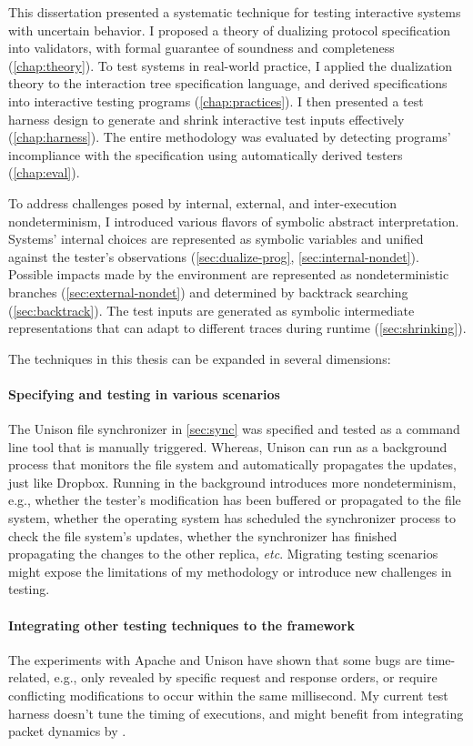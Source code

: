This dissertation presented a systematic technique for testing interactive systems
with uncertain behavior.  I proposed a theory of dualizing protocol
specification into validators, with formal guarantee of soundness and
completeness (\autoref{chap:theory}).  To test systems in real-world practice, I
applied the dualization theory to the interaction tree specification language,
and derived specifications into interactive testing programs
(\autoref{chap:practices}).  I then presented a test harness design to generate
and shrink interactive test inputs effectively (\autoref{chap:harness}).  The
entire methodology was evaluated by detecting programs' incompliance with the
specification using automatically derived testers (\autoref{chap:eval}).

To address challenges posed by internal, external, and inter-execution
nondeterminism, I introduced various flavors of symbolic abstract
interpretation.  Systems' internal choices are represented as symbolic variables
and unified against the tester's observations (\autoref{sec:dualize-prog},
\autoref{sec:internal-nondet}).  Possible impacts made by the environment are
represented as nondeterministic branches (\autoref{sec:external-nondet}) and
determined by backtrack searching (\autoref{sec:backtrack}).  The test inputs
are generated as symbolic intermediate representations that can adapt to
different traces during runtime (\autoref{sec:shrinking}).

The techniques in this thesis can be expanded in several dimensions:
\paragraph{Specifying and testing in various scenarios}
The Unison file synchronizer in \autoref{sec:sync} was specified and tested as a
command line tool that is manually triggered.  Whereas, Unison can run as a
background process that monitors the file system and automatically propagates
the updates, just like Dropbox.  Running in the background introduces more
nondeterminism, e.g., whether the tester's modification has been buffered or
propagated to the file system, whether the operating system has scheduled the
synchronizer process to check the file system's updates, whether the
synchronizer has finished propagating the changes to the other replica, {\it
etc}.  Migrating testing scenarios might expose the limitations of my
methodology or introduce new challenges in testing.

\paragraph{Integrating other testing techniques to the framework}
The experiments with Apache and Unison have shown that some bugs are
time-related, e.g., only revealed by specific request and response orders, or
require conflicting modifications to occur within the same millisecond.  My
current test harness doesn't tune the timing of executions, and might benefit
from integrating packet dynamics by \citet{pkt-dyn}.

